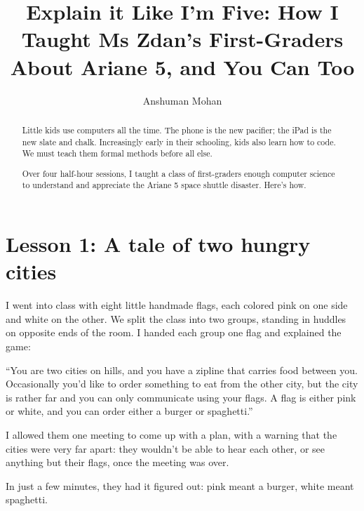 \documentclass[sigplan,review]{acmart}
\begin{document}
\title[Explain it Like I'm Five]{Explain it Like I'm Five: How I Taught Ms Zdan's First-Graders About Ariane 5, and You Can Too}

\author{Anshuman Mohan}

\begin{abstract}

Little kids use computers all the time.
The phone is the new pacifier; the iPad is the new slate and chalk.
Increasingly early in their schooling, kids also learn how to code.
We must teach them formal methods before all else.

Over four half-hour sessions, I taught a class of first-graders enough computer science to understand and appreciate the Ariane 5 space shuttle disaster.
Here's how.

\end{abstract}

\maketitle

\section*{Lesson 1: A tale of two hungry cities}

I went into class with eight little handmade flags, each colored pink on one side and white on the other.
We split the class into two groups, standing in huddles on opposite ends of the room.
I handed each group one flag and explained the game:

``You are two cities on hills, and you have a zipline that carries food between you.
Occasionally you'd like to order something to eat from the other city, but the city is rather far and you can only communicate using your flags.
A flag is either pink or white, and you can order either a burger or spaghetti.''

I allowed them one meeting to come up with a plan, with a warning that the cities were very far apart: they wouldn't be able to hear each other, or see anything but their flags, once the meeting was over.

In just a few minutes, they had it figured out: pink meant a burger, white meant spaghetti.
\end{document}
